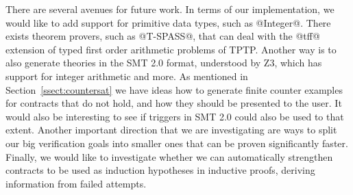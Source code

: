 
There are several avenues for future work. 
In terms of our implementation, we would like 
to add support for primitive data types, such as @Integer@. There exists
theorem provers, such as @T-SPASS@, that can deal with the @tff@ extension 
of typed first order arithmetic problems of TPTP. Another way is to also 
generate theories in the SMT 2.0 format, understood by Z3, which has support 
for integer arithmetic and more. As mentioned in Section~\ref{ssect:countersat} 
we have ideas how to generate finite counter examples for contracts that do not 
hold, and how they should be presented to the user. It would also be interesting 
to see if triggers in SMT 2.0 could also be used to that extent. Another important 
direction that we are investigating are ways to split our big verification goals
into smaller ones that can be proven significantly faster. Finally, we would like
to investigate whether we can automatically strengthen contracts to be used as 
induction hypotheses in inductive proofs, deriving information from failed attempts.

